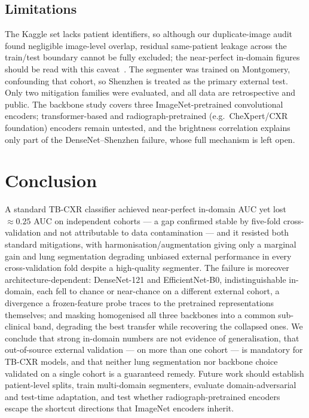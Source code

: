 \documentclass[journal]{IEEEtran}
\begin{document}
\subsection*{Limitations}
The Kaggle set lacks patient identifiers, so although our duplicate-image audit
found negligible image-level overlap, residual same-patient leakage across the
train/test boundary cannot be fully excluded; the near-perfect in-domain
figures should be read with this
caveat~\cite{rouzrokh2022mitigating, tampu2022inflation}. The segmenter was
trained on Montgomery, confounding that cohort, so Shenzhen is treated as the
primary external test. Only two mitigation families were evaluated, and all
data are retrospective and public. The backbone study covers three
ImageNet-pretrained convolutional encoders; transformer-based and
radiograph-pretrained (e.g.\ CheXpert/CXR foundation) encoders remain untested,
and the brightness correlation explains only part of the DenseNet--Shenzhen
failure, whose full mechanism is left open.

\section{Conclusion}

A standard TB-CXR classifier achieved near-perfect in-domain AUC yet lost
${\approx}0.25$ AUC on independent cohorts --- a gap confirmed stable by
five-fold cross-validation and not attributable to data contamination --- and
it resisted both standard mitigations, with harmonisation/augmentation giving
only a marginal gain and lung segmentation degrading unbiased external
performance in every cross-validation fold despite a high-quality segmenter.
The failure is moreover architecture-dependent: DenseNet-121 and
EfficientNet-B0, indistinguishable in-domain, each fell to chance or
near-chance on a different external cohort, a divergence a frozen-feature probe
traces to the pretrained representations themselves; and masking homogenised
all three backbones into a common sub-clinical band, degrading the best
transfer while recovering the collapsed ones. We conclude that strong in-domain
numbers are not evidence of generalisation, that out-of-source external
validation --- on more than one cohort --- is mandatory for TB-CXR models, and
that neither lung segmentation nor backbone choice validated on a single cohort
is a guaranteed remedy. Future work should establish patient-level splits,
train multi-domain segmenters, evaluate domain-adversarial and test-time
adaptation, and test whether radiograph-pretrained encoders escape the shortcut
directions that ImageNet encoders inherit.
\end{document}
